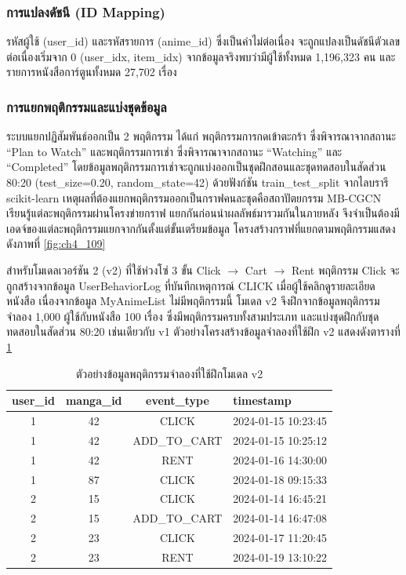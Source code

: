 \subsubsection{การแปลงดัชนี (ID Mapping)}
รหัสผู้ใช้ (user\_id) และรหัสรายการ (anime\_id) ซึ่งเป็นค่าไม่ต่อเนื่อง จะถูกแปลงเป็นดัชนีตัวเลขต่อเนื่องเริ่มจาก 0 (user\_idx, item\_idx) จากข้อมูลจริงพบว่ามีผู้ใช้ทั้งหมด 1,196,323 คน และรายการหนังสือการ์ตูนทั้งหมด 27,702 เรื่อง

\subsubsection{การแยกพฤติกรรมและแบ่งชุดข้อมูล}
ระบบแยกปฏิสัมพันธ์ออกเป็น 2 พฤติกรรม ได้แก่ พฤติกรรมการกดเข้าตะกร้า ซึ่งพิจารณาจากสถานะ ``Plan to Watch'' และพฤติกรรมการเช่า ซึ่งพิจารณาจากสถานะ ``Watching'' และ ``Completed'' โดยข้อมูลพฤติกรรมการเช่าจะถูกแบ่งออกเป็นชุดฝึกสอนและชุดทดสอบในสัดส่วน 80:20 (test\_size=0.20, random\_state=42) ด้วยฟังก์ชัน train\_test\_split จากไลบรารี scikit-learn เหตุผลที่ต้องแยกพฤติกรรมออกเป็นกราฟคนละชุดคือสถาปัตยกรรม MB-CGCN เรียนรู้แต่ละพฤติกรรมผ่านโครงข่ายกราฟ แยกกันก่อนนำผลลัพธ์มารวมกันในภายหลัง จึงจำเป็นต้องมีเอดจ์ของแต่ละพฤติกรรมแยกจากกันตั้งแต่ขั้นเตรียมข้อมูล โครงสร้างกราฟที่แยกตามพฤติกรรมแสดงดังภาพที่ \ref{fig:ch4_109}

สำหรับโมเดลเวอร์ชัน 2 (v2) ที่ใช้ห่วงโซ่ 3 ขั้น Click $\to$ Cart $\to$ Rent พฤติกรรม Click จะถูกสร้างจากข้อมูล UserBehaviorLog ที่บันทึกเหตุการณ์ CLICK เมื่อผู้ใช้คลิกดูรายละเอียดหนังสือ เนื่องจากข้อมูล MyAnimeList ไม่มีพฤติกรรมนี้ โมเดล v2 จึงฝึกจากข้อมูลพฤติกรรมจำลอง 1,000 ผู้ใช้กับหนังสือ 100 เรื่อง ซึ่งมีพฤติกรรมครบทั้งสามประเภท และแบ่งชุดฝึกกับชุดทดสอบในสัดส่วน 80:20 เช่นเดียวกับ v1 ตัวอย่างโครงสร้างข้อมูลจำลองที่ใช้ฝึก v2 แสดงดังตารางที่ \ref{tab:ch4_43}

\begin{table}[H]
\centering
\caption{ตัวอย่างข้อมูลพฤติกรรมจำลองที่ใช้ฝึกโมเดล v2}
\label{tab:ch4_43}
\small
\begin{tabular}{|c|c|c|l|}
\hline
\textbf{user\_id} & \textbf{manga\_id} & \textbf{event\_type} & \textbf{timestamp} \\ \hline
1 & 42 & CLICK & 2024-01-15 10:23:45 \\ \hline
1 & 42 & ADD\_TO\_CART & 2024-01-15 10:25:12 \\ \hline
1 & 42 & RENT & 2024-01-16 14:30:00 \\ \hline
1 & 87 & CLICK & 2024-01-18 09:15:33 \\ \hline
2 & 15 & CLICK & 2024-01-14 16:45:21 \\ \hline
2 & 15 & ADD\_TO\_CART & 2024-01-14 16:47:08 \\ \hline
2 & 23 & CLICK & 2024-01-17 11:20:45 \\ \hline
2 & 23 & RENT & 2024-01-19 13:10:22 \\ \hline
\end{tabular}
\end{table}

